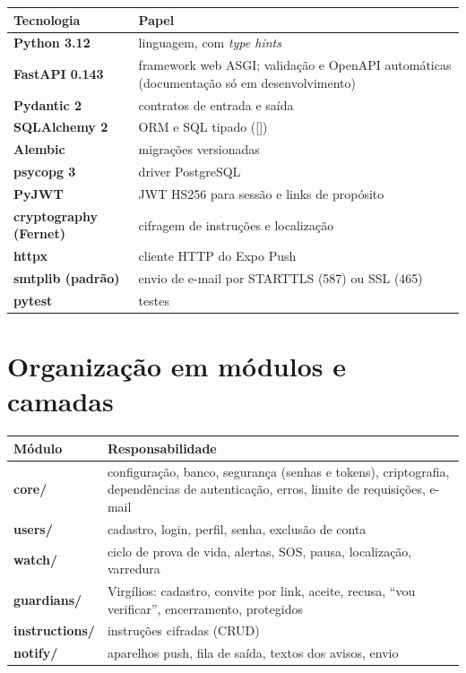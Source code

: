 \documentclass[11pt,a4paper]{report}
\DeclareRobustCommand{\code}[1]{\begingroup\noexpandarg\StrSubstitute{#1}{/}{/\allowbreak}[\monotmp]\texttt{\small\monotmp}\endgroup}
\begin{document}
\begin{center}
\begin{tabularx}{\textwidth}{@{}>{\bfseries}l Y@{}}
\toprule
Tecnologia & Papel \\
\midrule
Python 3.12 & linguagem, com \emph{type hints} \\
FastAPI 0.143 & framework web ASGI; validação e OpenAPI automáticas (documentação só em desenvolvimento) \\
Pydantic 2 & contratos de entrada e saída \\
SQLAlchemy 2 & ORM e SQL tipado (\code{Mapped[...]}) \\
Alembic & migrações versionadas \\
psycopg 3 & driver PostgreSQL \\
PyJWT & JWT HS256 para sessão e links de propósito \\
cryptography (Fernet) & cifragem de instruções e localização \\
httpx & cliente HTTP do Expo Push \\
smtplib (padrão) & envio de e-mail por STARTTLS (587) ou SSL (465) \\
pytest & testes \\
\bottomrule
\end{tabularx}
\end{center}

\section{Organização em módulos e camadas}

\begin{center}
\begin{tabularx}{\textwidth}{@{}>{\bfseries\ttfamily}l Y@{}}
\toprule
\normalfont\bfseries Módulo & Responsabilidade \\
\midrule
core/ & configuração, banco, segurança (senhas e tokens), criptografia, dependências de autenticação, erros, limite de requisições, e-mail \\
users/ & cadastro, login, perfil, senha, exclusão de conta \\
watch/ & ciclo de prova de vida, alertas, SOS, pausa, localização, varredura \\
guardians/ & Virgílios: cadastro, convite por link, aceite, recusa, ``vou verificar'', encerramento, protegidos \\
instructions/ & instruções cifradas (CRUD) \\
notify/ & aparelhos push, fila de saída, textos dos avisos, envio \\
\bottomrule
\end{tabularx}
\end{center}
\end{document}
